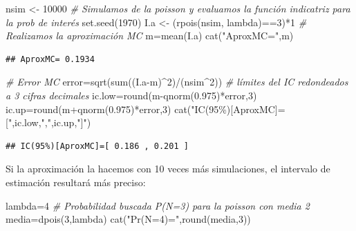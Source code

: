 \documentclass[
]{book}
\newenvironment{Shaded}{\begin{snugshade}}{\end{snugshade}}
\newcommand{\CommentTok}[1]{\textcolor[rgb]{0.56,0.35,0.01}{\textit{#1}}}
\newcommand{\DecValTok}[1]{\textcolor[rgb]{0.00,0.00,0.81}{#1}}
\newcommand{\FloatTok}[1]{\textcolor[rgb]{0.00,0.00,0.81}{#1}}
\newcommand{\FunctionTok}[1]{\textcolor[rgb]{0.00,0.00,0.00}{#1}}
\newcommand{\NormalTok}[1]{#1}
\newcommand{\OtherTok}[1]{\textcolor[rgb]{0.56,0.35,0.01}{#1}}
\newcommand{\SpecialCharTok}[1]{\textcolor[rgb]{0.00,0.00,0.00}{#1}}
\newcommand{\StringTok}[1]{\textcolor[rgb]{0.31,0.60,0.02}{#1}}
\theoremstyle{definition}
\theoremstyle{definition}
\theoremstyle{definition}
\theoremstyle{definition}
\theoremstyle{remark}
\begin{document}
\begin{Shaded}
\begin{Highlighting}[]
\NormalTok{nsim }\OtherTok{\textless{}{-}} \DecValTok{10000}
\CommentTok{\# Simulamos de la poisson y evaluamos la función indicatriz para la prob de interés}
\FunctionTok{set.seed}\NormalTok{(}\DecValTok{1970}\NormalTok{)}
\NormalTok{I.a }\OtherTok{\textless{}{-}}\NormalTok{ (}\FunctionTok{rpois}\NormalTok{(nsim, lambda)}\SpecialCharTok{==}\DecValTok{3}\NormalTok{)}\SpecialCharTok{*}\DecValTok{1}
\CommentTok{\# Realizamos la aproximación MC}
\NormalTok{m}\OtherTok{=}\FunctionTok{mean}\NormalTok{(I.a)}
\FunctionTok{cat}\NormalTok{(}\StringTok{"AproxMC="}\NormalTok{,m)}
\end{Highlighting}
\end{Shaded}

\begin{verbatim}
## AproxMC= 0.1934
\end{verbatim}

\begin{Shaded}
\begin{Highlighting}[]
\CommentTok{\# Error MC}
\NormalTok{error}\OtherTok{=}\FunctionTok{sqrt}\NormalTok{(}\FunctionTok{sum}\NormalTok{((I.a}\SpecialCharTok{{-}}\NormalTok{m)}\SpecialCharTok{\^{}}\DecValTok{2}\NormalTok{)}\SpecialCharTok{/}\NormalTok{(nsim}\SpecialCharTok{\^{}}\DecValTok{2}\NormalTok{))}
\CommentTok{\# límites del IC redondeados a 3 cifras decimales}
\NormalTok{ic.low}\OtherTok{=}\FunctionTok{round}\NormalTok{(m}\SpecialCharTok{{-}}\FunctionTok{qnorm}\NormalTok{(}\FloatTok{0.975}\NormalTok{)}\SpecialCharTok{*}\NormalTok{error,}\DecValTok{3}\NormalTok{)}
\NormalTok{ic.up}\OtherTok{=}\FunctionTok{round}\NormalTok{(m}\SpecialCharTok{+}\FunctionTok{qnorm}\NormalTok{(}\FloatTok{0.975}\NormalTok{)}\SpecialCharTok{*}\NormalTok{error,}\DecValTok{3}\NormalTok{)}
\FunctionTok{cat}\NormalTok{(}\StringTok{"IC(95\%)[AproxMC]=["}\NormalTok{,ic.low,}\StringTok{","}\NormalTok{,ic.up,}\StringTok{"]"}\NormalTok{)}
\end{Highlighting}
\end{Shaded}

\begin{verbatim}
## IC(95%)[AproxMC]=[ 0.186 , 0.201 ]
\end{verbatim}

Si la aproximación la hacemos con 10 veces más simulaciones, el intervalo de estimación resultará más preciso:

\begin{Shaded}
\begin{Highlighting}[]
\NormalTok{lambda}\OtherTok{=}\DecValTok{4}
\CommentTok{\# Probabilidad buscada P(N=3) para la poisson con media 2}
\NormalTok{media}\OtherTok{=}\FunctionTok{dpois}\NormalTok{(}\DecValTok{3}\NormalTok{,lambda)}
\FunctionTok{cat}\NormalTok{(}\StringTok{"Pr(N=4)="}\NormalTok{,}\FunctionTok{round}\NormalTok{(media,}\DecValTok{3}\NormalTok{))}
\end{Highlighting}
\end{Shaded}
\end{document}
